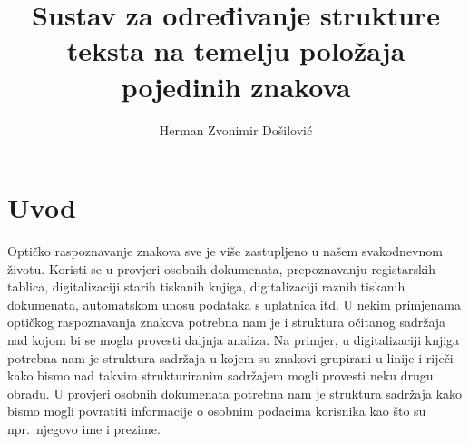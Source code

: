 \documentclass[times, utf8, zavrsni]{fer}
\begin{document}


\title{
    Sustav za određivanje strukture teksta na temelju položaja pojedinih znakova
}

\author{Herman Zvonimir Došilović}

\maketitle




\tableofcontents
















\chapter{Uvod}
Optičko raspoznavanje znakova sve je više zastupljeno u našem svakodnevnom
životu. Koristi se u provjeri osobnih dokumenata, prepoznavanju registarskih
tablica, digitalizaciji starih tiskanih knjiga, digitalizaciji raznih tiskanih
dokumenata, automatskom unosu podataka s uplatnica itd. U nekim primjenama
optičkog raspoznavanja znakova potrebna nam je i struktura očitanog sadržaja
nad kojom bi se mogla provesti daljnja analiza. Na primjer, u digitalizaciji
knjiga potrebna nam je struktura sadržaja u kojem su znakovi grupirani u linije
i riječi kako bismo nad takvim strukturiranim sadržajem mogli provesti neku
drugu obradu. U provjeri osobnih dokumenata potrebna nam je struktura sadržaja
kako bismo mogli povratiti informacije o osobnim podacima korisnika kao što su
npr.\ njegovo ime i prezime.
\end{document}
